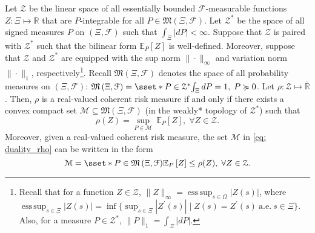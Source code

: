 \documentclass[final,onefignum,onetabnum]{class}
\DeclareMathOperator*{\esssup}{ess\,sup}
\newcommand{\ee}[2]{\mathbb{E}_{#1} \left[ #2 \right]}
\newcommand{\Bs}[1]{\mathbb{#1}} %
\newcommand{\Cs}[1]{\mathcal{#1}} %
\newcommand{\Fs}[1]{\mathfrak{#1}} %
\newcommand{\ol}[1]{\overline{#1}}
\newcommand{\measurespace}{\left( \Xi, \Cs{F} \right)}
\begin{document}
\begin{theorem}
    \label{thm: rev.duality_rho}
	Let $\Cs{Z}$ be the linear space of all essentially bounded $\Cs{F}$-measurable functions $Z: \Xi \mapsto \Bs{R}$ that are $P$-integrable for all $P \in \Fs{M}\measurespace$. Let  $\Cs{Z}^{*}$ be the space of all  signed measures $P$ on $\measurespace$ such that $\int_{\Xi} |d P| < \infty$. Suppose that $\Cs{Z}$ is paired with $\Cs{Z}^{*}$ such that the bilinear form $\ee{P}{Z}$ is well-defined. Moreover, suppose that $\Cs{Z}$ and $\Cs{Z}^{*}$ are equipped with the sup norm $\|\cdot\|_{\infty}$ and variation norm $\|\cdot\|_{1}$, respectively\footnote{Recall that  for a function $Z \in \Cs{Z}$, $\|Z\|_{\infty}=\esssup_{s \in \Omega} |Z(s)|$, where 
$\esssup_{s \in \Xi} |Z(s)|=\inf\Big\{\sup_{s \in \Xi} |Z^{\prime}(s)| \; \Big| \; Z(s)=Z^{\prime}(s) \ \text{a.e.} \ s \in \Xi \Big\}$. Also, for a measure $P \in \Cs{Z}^{*}$, $\|P\|_{1}=\int_{\Xi} |d P|  $. }. Recall $\Fs{M}\measurespace$ denotes the space of all probability measures on $\measurespace$:  $\Fs{M}\measurespace=\sset*{ P \in \Cs{Z}^{*}}{\int_{\Xi}  d P=1, \;  P \succcurlyeq 0} $. Let  $\rho: \Cs{Z} \mapsto \ol{\Bs{R}}$. Then, $\rho$  is a real-valued  
	coherent risk measure if and only if  %
	there exists a convex compact set $\Cs{M} \subseteq \Fs{M}\measurespace$ (in the weakly* topology of $\Cs{Z}^{*}$)  such that 
	\begin{equation}
	\label{eq: duality_rho}
	\rho(Z)= \sup_{P \in \Cs{M}} \ \ee{P}{Z}, \; \forall Z \in \Cs{Z}.
	\end{equation}
	Moreover, given a  real-valued coherent risk measure, the set $\Cs{M}$ in \eqref{eq: duality_rho} can be written in the form
	\begin{equation*}
	\Cs{M}= \sset*{P \in \Fs{M}\measurespace}{\ee{P}{Z} \le \rho(Z), \;  \forall Z \in \Cs{Z}}. 
	\end{equation*}
\end{theorem}
\end{document}
